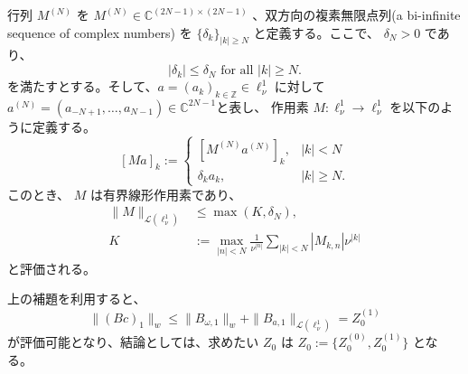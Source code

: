 \begin{prop}
行列 $M^{(N)}$ を $M^{(N)} \in \mathbb{C}^{(2N-1) \times (2N-1)}$ 、双方向の複素無限点列(a bi-infinite sequence of complex numbers) を $\{ \delta_k \}_{|k| \geq N}$ と定義する。ここで、 $\delta_N > 0$ であり、
$$
    |\delta_k| \leq \delta_N \text{ for all } |k| \geq N.
$$
を満たすとする。そして、$a = (a_k)_{k \in \mathbb{Z}} \in \ell^1_\nu$ に対して 
$a^{(N)} = (a_{-N+1} , \dots, a_{N-1}) \in \mathbb{C}^{2N-1}$と表し、
作用素 $M:\ell_{\nu}^1\to \ell_{\nu}^1$ を以下のように定義する。
$$
    [Ma]_k := 
    \begin{cases}
    [M^{(N)}a^{(N)}]_k, & |k| < N \\
    \delta_k a_k ,& |k| \geq N.
    \end{cases}
$$
このとき、 $M$ は有界線形作用素であり、
\begin{align*}
    \|M\|_{\mathcal{L}(\ell^1_\nu)} &\leq \max{(K,\delta_N)},\\
    K &:= \max_{|n|<N} \frac{1}{\nu^{|n|}} \sum_{|k|<N} |M_{k,n}| \nu^{|k|}
\end{align*}
と評価される。
\end{prop}

上の補題を利用すると、
$$
    \| (Bc)_1 \|_w \leq \| B_{\omega,1} \|_w + \| B_{a,1} \|_{\mathcal{L}(\ell_\nu^{1})} = Z_0^{(1)}
$$
が評価可能となり、結論としては、求めたい $Z_0$ は $Z_0 := \{Z_0^{(0)}, Z_0^{(1)}\}$ となる。

